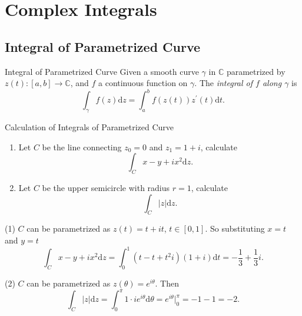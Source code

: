 
\section{Complex Integrals}

\subsection{Integral of Parametrized Curve}

\begin{definition}{Integral of Parametrized Curve}{}
  Given a smooth curve $\gamma$ in $\mathbb{C}$ parametrized by $z(t):[a,b] \rightarrow \mathbb{C}$,
  and $f$ a continuous function on $\gamma$.
  The \emph{integral of $f$ along $\gamma$} is
  \begin{equation}
    \int_{\gamma} f(z)\mathrm{d} z = \int_a^b f(z(t)) z^{\prime}(t) \mathrm{d} t.
  \end{equation}
\end{definition}

\begin{example}{Calculation of Integrals of Parametrized Curve}{}
  \begin{enumerate}
  \item Let $C$ be the line connecting $z_0 = 0$ and $z_1 = 1 + i$, calculate
    \begin{equation}
      \int_C x - y + ix^2 \mathrm{d} z.
    \end{equation}
  \item Let $C$ be the upper semicircle with radius $r = 1$, calculate
    \begin{equation}
      \int_C |z| \mathrm{d} z.
    \end{equation}
  \end{enumerate}
\end{example}

\begin{solution}
  (1) $C$ can be parametrized as $z(t) = t + it$, $t \in [0, 1]$.
  So substituting $x = t$ and $y = t$
  \begin{equation}
    \int_C x-y+ix^2 \mathrm{d} z = \int_0^1 (t - t + t^2 i) (1 + i)\mathrm{d} t
    = - \frac{1}{3} + \frac{1}{3} i.
  \end{equation}

  (2) $C$ can be parametrized as $z(\theta) = e^{i\theta}$. Then
  \begin{equation}
    \int_C |z|\mathrm{d} z = \int_0^{\pi} 1 \cdot i e^{i\theta}\mathrm{d} \theta
    = e^{i\theta} \big|^{\pi}_0 = -1 - 1 = -2.
  \end{equation}
\end{solution}

